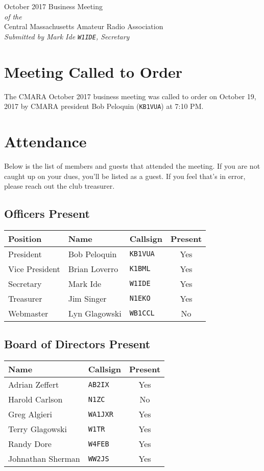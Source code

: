 \documentclass[10pt,letterpaper]{article}
\begin{document}
\begin{center}
{\huge October 2017 Business Meeting}\\
\emph{of the}\\
{\Large Central Massachusetts Amateur Radio Association}\\
\emph{Submitted by Mark Ide \texttt{W1IDE}, Secretary}
\end{center}

\section{Meeting Called to Order}
The CMARA October 2017 business meeting was called to order on October 19, 2017 by CMARA president Bob Peloquin (\texttt{KB1VUA}) at 7:10 PM.

\section{Attendance}
\noindent
Below is the list of members and guests that attended the meeting. If you are not caught up on your dues, you'll be listed as a guest. If you feel that's in error, please reach out the club treasurer.

\subsection{Officers Present}
\begin{tabular}{|l|l|l|c|}
  \hline
  \textbf{Position} & \textbf{Name}  & \textbf{Callsign} & \textbf{Present} \\ \hline
  President         & Bob Peloquin   & \texttt{KB1VUA}   & Yes \\
  Vice President    & Brian Loverro  & \texttt{K1BML}    & Yes \\
  Secretary         & Mark Ide       & \texttt{W1IDE}    & Yes \\
  Treasurer         & Jim Singer     & \texttt{N1EKO}    & Yes \\
  Webmaster         & Lyn Glagowski  & \texttt{WB1CCL}   & No  \\
  \hline
\end{tabular}

\subsection{Board of Directors Present}
\begin{tabular}{|l|l|c|}
  \hline
  \textbf{Name}     & \textbf{Callsign} & \textbf{Present} \\ \hline
  Adrian Zeffert    & \texttt{AB2IX}    & Yes \\
  Harold Carlson    & \texttt{N1ZC}     & No  \\
  Greg Algieri      & \texttt{WA1JXR}   & Yes \\
  Terry Glagowski   & \texttt{W1TR}     & Yes \\
  Randy Dore        & \texttt{W4FEB}    & Yes \\
  Johnathan Sherman & \texttt{WW2JS}    & Yes \\
  \hline
\end{tabular}
\end{document}
